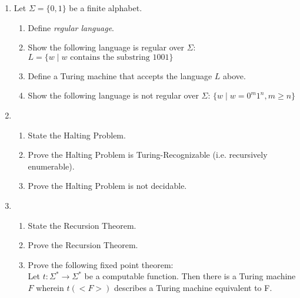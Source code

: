 \documentclass[11pt]{article}
\begin{document}
\begin{enumerate}

\item Let $\Sigma = \{0,1\}$ be a finite alphabet.
	\begin{enumerate}
	\itemsep = 0pt
		\item Define {\em regular language}.
		\item Show the following language is regular over $\Sigma$:
		$
			L = \{ w \mid \mbox{$w$ contains the substring $1001$} \}
		$
		\item Define a Turing machine that accepts the language $L$ above.
		\item Show the following language is not regular over $\Sigma$:
		$
			\{ w \mid w = 0^m1^n, m \geq n \}
		$
	\end{enumerate}


\item 
	\begin{enumerate}
	\itemsep= 0pt
		\item State the Halting Problem.
		\item Prove the Halting Problem is Turing-Recognizable (i.e. recursively enumerable).
		\item Prove the Halting Problem is not decidable.
	\end{enumerate}

\item 
	\begin{enumerate}
		\itemsep=0pt
		\item State the Recursion Theorem.
		\item Prove the Recursion Theorem.
		\item Prove the following fixed point theorem:\\
			Let $t:\Sigma^* \rightarrow \Sigma^*$ be a computable function.
			Then there is a Turing machine $F$ wherein $t(<F>)$ describes a
			Turing machine equivalent to F.
	\end{enumerate}



\end{enumerate}
\end{document}
